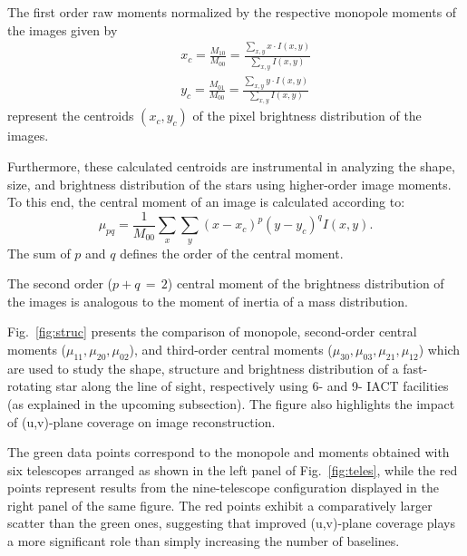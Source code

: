The first order raw moments normalized by the respective monopole moments of the images given by 
\begin{eqnarray}
&&x_c = \frac{M_{10}}{M_{00}} = \frac{\sum_{x,y} x \cdot I(x,y)}{\sum_{x,y} I(x,y)} \nonumber \\
&&y_c = \frac{M_{01}}{M_{00}} = \frac{\sum_{x,y} y \cdot I(x,y)}{\sum_{x,y} I(x,y)}
\label{eqn:Centroid}
\end{eqnarray}
represent the centroids $(x_c, y_c)$ of the pixel brightness distribution of the images.

Furthermore, these calculated centroids are instrumental in analyzing the shape, size, and brightness distribution of the stars using higher-order image moments. To this end, the central moment of an image is calculated according to:
\begin{equation}
	\mu_{pq} = \frac{1}{M_{00}}\sum_{x} \sum_{y} (x - x_c)^p (y - y_c)^q I(x, y).
\label{eqn:Central-Mom}
\end{equation}
The sum of \(p\) and \(q\) defines the order of the central moment. 

The second order ($p+q\,=\,2$) central moment of the brightness distribution of the images is analogous to the moment of inertia of a mass distribution. 

Fig.~\ref{fig:struc} presents the comparison of monopole, second-order central moments (\(\mu_{11}, \mu_{20}, \mu_{02}\)), and third-order central moments (\(\mu_{30}, \mu_{03}, \mu_{21}, \mu_{12}\)) which are used to study the shape, structure and brightness distribution of a fast-rotating star along the line of sight, respectively using 6- and 9- IACT facilities (as explained in the upcoming subsection). The figure also highlights the impact of (u,v)-plane coverage on image reconstruction.

The green data points correspond to the monopole and moments obtained with six telescopes arranged as shown in the left panel of Fig.~\ref{fig:teles}, while the red points represent results from the nine-telescope configuration displayed in the right panel of the same figure. The red points exhibit a comparatively larger scatter than the green ones, suggesting that improved (u,v)-plane coverage plays a more significant role than simply increasing the number of baselines.

